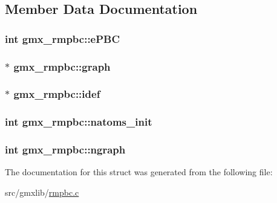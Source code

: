 \subsection{\-Member \-Data \-Documentation}
\hypertarget{structgmx__rmpbc_accd51a022d35b1cb437cab4151904be4}{
\subsubsection[{e\-P\-B\-C}]{\setlength{\rightskip}{0pt plus 5cm}int {\bf gmx\-\_\-rmpbc\-::e\-P\-B\-C}}}\label{structgmx__rmpbc_accd51a022d35b1cb437cab4151904be4}
\hypertarget{structgmx__rmpbc_a44e3b69ff94d57f4bea02fe94e0b1a49}{
\subsubsection[{graph}]{$\ast$ {\bf gmx\-\_\-rmpbc\-::graph}}}\label{structgmx__rmpbc_a44e3b69ff94d57f4bea02fe94e0b1a49}
\hypertarget{structgmx__rmpbc_a60f556a5f6ec031da76984c92bb0bfa7}{
\subsubsection[{idef}]{$\ast$ {\bf gmx\-\_\-rmpbc\-::idef}}}\label{structgmx__rmpbc_a60f556a5f6ec031da76984c92bb0bfa7}
\hypertarget{structgmx__rmpbc_ae40ad6b0786da5a6383e656b96ef74eb}{
\subsubsection[{natoms\-\_\-init}]{\setlength{\rightskip}{0pt plus 5cm}int {\bf gmx\-\_\-rmpbc\-::natoms\-\_\-init}}}\label{structgmx__rmpbc_ae40ad6b0786da5a6383e656b96ef74eb}
\hypertarget{structgmx__rmpbc_a911597a497f708bda1dfb2aa6b3ce781}{
\subsubsection[{ngraph}]{\setlength{\rightskip}{0pt plus 5cm}int {\bf gmx\-\_\-rmpbc\-::ngraph}}}\label{structgmx__rmpbc_a911597a497f708bda1dfb2aa6b3ce781}


\-The documentation for this struct was generated from the following file\-:\begin{DoxyCompactItemize}
\item 
src/gmxlib/\hyperlink{rmpbc_8c}{rmpbc.\-c}\end{DoxyCompactItemize}
